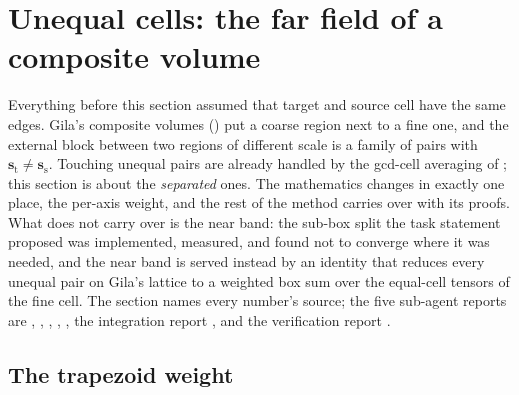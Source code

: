 \section{Unequal cells: the far field of a composite volume}
\label{sec:xs}

Everything before this section assumed that target and source cell have the same edges.
Gila's composite volumes () put a coarse region next to a fine one, and the
external block between two regions of different scale is a family of pairs with
$\mathbf{s}_{\mathrm{t}} \ne \mathbf{s}_{\mathrm{s}}$. Touching unequal pairs are already
handled by the gcd-cell averaging of ; this section is about the
\emph{separated} ones. The mathematics changes in exactly one place, the per-axis weight,
and the rest of the method carries over with its proofs. What does not carry over is the
near band: the sub-box split the task statement proposed was implemented, measured, and
found not to converge where it was needed, and the near band is served instead by an
identity that reduces every unequal pair on Gila's lattice to a weighted box sum over the
equal-cell tensors of the fine cell. The section names every number's source; the five
sub-agent reports are , , ,
, , the integration report , and the
verification report .

\subsection{The trapezoid weight}
\label{sec:xs:w}

